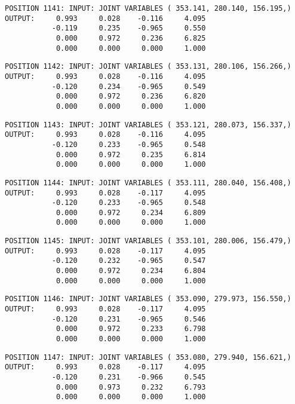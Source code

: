 \begin{verbatim}
POSITION 1141: INPUT: JOINT VARIABLES ( 353.141, 280.140, 156.195,)
OUTPUT:     0.993     0.028    -0.116     4.095
           -0.119     0.235    -0.965     0.550
            0.000     0.972     0.236     6.825
            0.000     0.000     0.000     1.000
\end{verbatim} \pagebreak[1]\begin{verbatim}
POSITION 1142: INPUT: JOINT VARIABLES ( 353.131, 280.106, 156.266,)
OUTPUT:     0.993     0.028    -0.116     4.095
           -0.120     0.234    -0.965     0.549
            0.000     0.972     0.236     6.820
            0.000     0.000     0.000     1.000
\end{verbatim} \pagebreak[1]\begin{verbatim}
POSITION 1143: INPUT: JOINT VARIABLES ( 353.121, 280.073, 156.337,)
OUTPUT:     0.993     0.028    -0.116     4.095
           -0.120     0.233    -0.965     0.548
            0.000     0.972     0.235     6.814
            0.000     0.000     0.000     1.000
\end{verbatim} \pagebreak[1]\begin{verbatim}
POSITION 1144: INPUT: JOINT VARIABLES ( 353.111, 280.040, 156.408,)
OUTPUT:     0.993     0.028    -0.117     4.095
           -0.120     0.233    -0.965     0.548
            0.000     0.972     0.234     6.809
            0.000     0.000     0.000     1.000
\end{verbatim} \pagebreak[1]\begin{verbatim}
POSITION 1145: INPUT: JOINT VARIABLES ( 353.101, 280.006, 156.479,)
OUTPUT:     0.993     0.028    -0.117     4.095
           -0.120     0.232    -0.965     0.547
            0.000     0.972     0.234     6.804
            0.000     0.000     0.000     1.000
\end{verbatim} \pagebreak[1]\begin{verbatim}
POSITION 1146: INPUT: JOINT VARIABLES ( 353.090, 279.973, 156.550,)
OUTPUT:     0.993     0.028    -0.117     4.095
           -0.120     0.231    -0.965     0.546
            0.000     0.972     0.233     6.798
            0.000     0.000     0.000     1.000
\end{verbatim} \pagebreak[1]\begin{verbatim}
POSITION 1147: INPUT: JOINT VARIABLES ( 353.080, 279.940, 156.621,)
OUTPUT:     0.993     0.028    -0.117     4.095
           -0.120     0.231    -0.966     0.545
            0.000     0.973     0.232     6.793
            0.000     0.000     0.000     1.000
\end{verbatim} \pagebreak[1]\begin{verbatim}

\end{verbatim}
